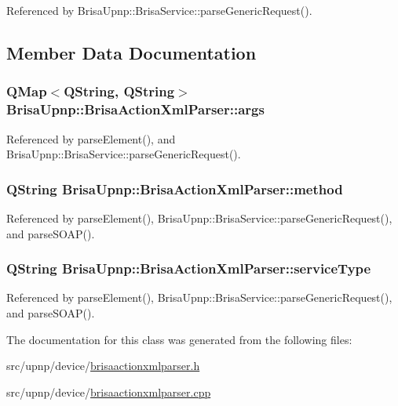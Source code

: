 Referenced by BrisaUpnp::BrisaService::parseGenericRequest().

\subsection{Member Data Documentation}
\hypertarget{classBrisaUpnp_1_1BrisaActionXmlParser_a1bd26f5d3b9a6bb452973d420b6c8691}{
\subsubsection[{args}]{\setlength{\rightskip}{0pt plus 5cm}QMap$<$QString, QString$>$ {\bf BrisaUpnp::BrisaActionXmlParser::args}}}
\label{classBrisaUpnp_1_1BrisaActionXmlParser_a1bd26f5d3b9a6bb452973d420b6c8691}


Referenced by parseElement(), and BrisaUpnp::BrisaService::parseGenericRequest().\hypertarget{classBrisaUpnp_1_1BrisaActionXmlParser_a2b691349bfddc01bf27faa8f492496cd}{
\subsubsection[{method}]{\setlength{\rightskip}{0pt plus 5cm}QString {\bf BrisaUpnp::BrisaActionXmlParser::method}}}
\label{classBrisaUpnp_1_1BrisaActionXmlParser_a2b691349bfddc01bf27faa8f492496cd}


Referenced by parseElement(), BrisaUpnp::BrisaService::parseGenericRequest(), and parseSOAP().\hypertarget{classBrisaUpnp_1_1BrisaActionXmlParser_adef5fd463e49e6e622ce1aa243fa34e2}{
\subsubsection[{serviceType}]{\setlength{\rightskip}{0pt plus 5cm}QString {\bf BrisaUpnp::BrisaActionXmlParser::serviceType}}}
\label{classBrisaUpnp_1_1BrisaActionXmlParser_adef5fd463e49e6e622ce1aa243fa34e2}


Referenced by parseElement(), BrisaUpnp::BrisaService::parseGenericRequest(), and parseSOAP().

The documentation for this class was generated from the following files:\begin{DoxyCompactItemize}
\item 
src/upnp/device/\hyperlink{brisaactionxmlparser_8h}{brisaactionxmlparser.h}\item 
src/upnp/device/\hyperlink{brisaactionxmlparser_8cpp}{brisaactionxmlparser.cpp}\end{DoxyCompactItemize}
